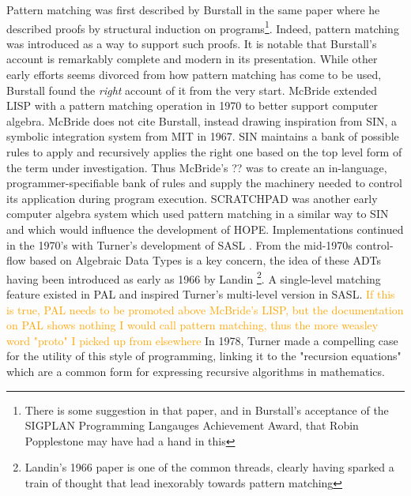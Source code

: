 \documentclass[acmsmall]{acmart}
\renewcommand\todo[1]{\textcolor{orange}{#1}}
\begin{document}
Pattern matching was first described by Burstall \cite{burstall_proving_1969} in the same paper where he described proofs by structural induction on programs\footnote{There is some suggestion in that paper, and in Burstall's acceptance of the SIGPLAN Programming Langauges Achievement Award\cite{wadler_sigplan_2009}, that Robin Popplestone may have had a hand in this}. Indeed, pattern matching was introduced as a way to support such proofs.  It is notable that Burstall's account is remarkably complete  and modern in its presentation.  While other early efforts seems divorced from how pattern matching has come to be used, Burstall found the \emph{right} account of it from the very start.  McBride\cite{mcbride_computer_1970} extended LISP with a pattern matching operation in 1970 to better support computer algebra.  McBride does not cite Burstall, instead drawing inspiration from SIN, a symbolic integration system from MIT in 1967.  SIN maintains a bank of possible rules to apply and recursively applies the right one based on the top level form of the term under investigation.  Thus McBride's ?? was to create an in-language, programmer-specifiable bank of rules and supply the machinery needed to control its application during program execution.  SCRATCHPAD \cite{jenks_scratchpad_1974} was another early computer algebra system which used pattern matching in a similar way to SIN and which would influence the development of HOPE.   Implementations continued in the 1970's with Turner's development of SASL \cite{turner_history_2013, turner_sasl_1976}.  From the mid-1970s control-flow based on Algebraic Data Types is a key concern, the idea of these ADTs having been introduced as early as 1966 by Landin \cite{landin_next_1966}\footnote{Landin's 1966 paper is one of the common threads, clearly having sparked a train of thought that lead inexorably towards pattern matching}.  A single-level matching feature existed in PAL \cite{evans_palx2014language_1968} and inspired Turner's multi-level version in SASL. \todo{If this is true, PAL needs to be promoted above McBride's LISP, but the documentation on PAL shows nothing I would call pattern matching, thus the more weasley word "proto" I picked up from elsewhere} In 1978, Turner \cite{turner_recursion_1978} made a compelling case for the utility of this style of programming, linking it to the "recursion equations" which are a common form for expressing recursive algorithms in mathematics.
\end{document}
